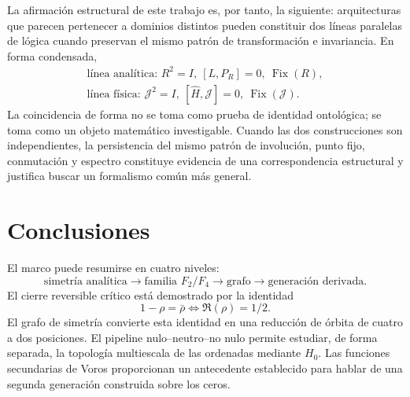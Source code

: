 \documentclass[11pt]{amsart}
\theoremstyle{definition}
\theoremstyle{remark}
\begin{document}
La afirmación estructural de este trabajo es, por tanto, la siguiente: arquitecturas que parecen pertenecer a dominios distintos pueden constituir dos líneas paralelas de lógica cuando preservan el mismo patrón de transformación e invariancia. En forma condensada,
\begin{equation}\label{eq:two-logic-lines}
 \boxed{
 \begin{array}{c}
 \text{línea analítica: } R^2=I,\ [L,P_R]=0,\ \operatorname{Fix}(R),\\[1mm]
 \text{línea física: } \mathcal J^2=I,\ [\widehat H,\mathcal J]=0,\ \operatorname{Fix}(\mathcal J).
 \end{array}}
\end{equation}
La coincidencia de forma no se toma como prueba de identidad ontológica; se toma como un objeto matemático investigable. Cuando las dos construcciones son independientes, la persistencia del mismo patrón de involución, punto fijo, conmutación y espectro constituye evidencia de una correspondencia estructural y justifica buscar un formalismo común más general.

\section{Conclusiones}
El marco puede resumirse en cuatro niveles:
\begin{equation}
 \boxed{\text{simetría analítica}\to\text{familia }F_2/F_4\to\text{grafo}\to\text{generación derivada}.}
\end{equation}
El cierre reversible crítico está demostrado por la identidad
\begin{equation}
 1-\rho=\bar\rho\iff\Re(\rho)=1/2.
\end{equation}
El grafo de simetría convierte esta identidad en una reducción de órbita de cuatro a dos posiciones. El pipeline nulo--neutro--no nulo permite estudiar, de forma separada, la topología multiescala de las ordenadas mediante $H_0$. Las funciones secundarias de Voros proporcionan un antecedente establecido para hablar de una segunda generación construida sobre los ceros.
\end{document}
